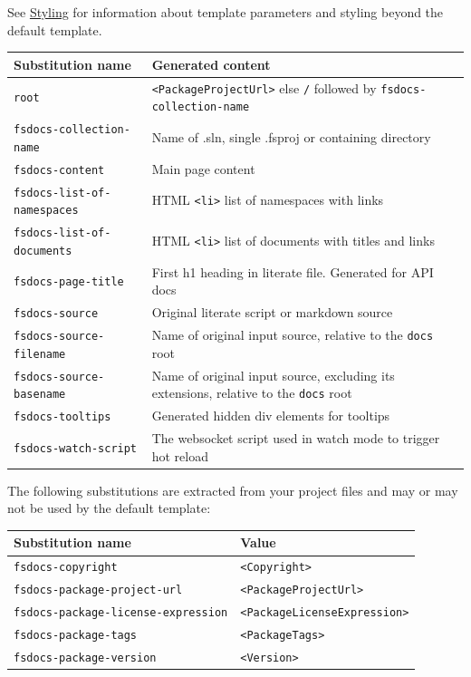 \documentclass{article}
\begin{document}
See \href{styling.html}{Styling} for information about template parameters and styling beyond the default template.
\begin{tabular}{|l|l|}\hline
\textbf{Substitution name} & \textbf{Generated content}\\ \hline\hline
\texttt{root} & \texttt{<PackageProjectUrl>} else \texttt{/} followed by \texttt{fsdocs-collection-name}\\ \hline
\texttt{fsdocs-collection-name} & Name of .sln, single .fsproj or containing directory\\ \hline
\texttt{fsdocs-content} & Main page content\\ \hline
\texttt{fsdocs-list-of-namespaces} & HTML \texttt{<li>} list of namespaces with links\\ \hline
\texttt{fsdocs-list-of-documents} & HTML \texttt{<li>} list of documents with  titles and links\\ \hline
\texttt{fsdocs-page-title} & First h1 heading in literate file. Generated for API docs\\ \hline
\texttt{fsdocs-source} & Original literate script or markdown source\\ \hline
\texttt{fsdocs-source-filename} & Name of original input source, relative to the \texttt{docs} root\\ \hline
\texttt{fsdocs-source-basename} & Name of original input source, excluding its extensions, relative to the \texttt{docs} root\\ \hline
\texttt{fsdocs-tooltips} & Generated hidden div elements for tooltips\\ \hline
\texttt{fsdocs-watch-script} & The websocket script used in watch mode to trigger hot reload\\ \hline
\end{tabular}



The following substitutions are extracted from your project files and may or may not be used by the default
template:
\begin{tabular}{|l|l|}\hline
\textbf{Substitution name} & \textbf{Value}\\ \hline\hline
\texttt{fsdocs-copyright} & \texttt{<Copyright>}\\ \hline
\texttt{fsdocs-package-project-url} & \texttt{<PackageProjectUrl>}\\ \hline
\texttt{fsdocs-package-license-expression} & \texttt{<PackageLicenseExpression>}\\ \hline
\texttt{fsdocs-package-tags} & \texttt{<PackageTags>}\\ \hline
\texttt{fsdocs-package-version} & \texttt{<Version>}\\ \hline
\end{tabular}
\end{document}
